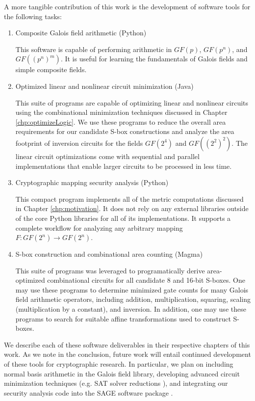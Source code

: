 A more tangible contribution of this work is the development of software tools for the following tasks:
\begin{enumerate}
	\item Composite Galois field arithmetic (Python)
	\vspace{1em}

	This software is capable of performing arithmetic in $GF(p)$, $GF(p^n)$, and $GF((p^n)^m)$. It is useful for learning the fundamentals of Galois fields and simple composite fields. 

	\item Optimized linear and nonlinear circuit minimization (Java)
	\vspace{1em}

	This suite of programs are capable of optimizing linear and nonlinear circuits using the combinational minimization techniques discussed in Chapter \ref{chp:optimizeLogic}. We use these programs to reduce the overall area requirements for our candidate S-box constructions and analyze the area footprint of inversion circuits for the fields $GF(2^4)$ and $GF((2^2)^2)$. The linear circuit optimizations come with sequential and parallel implementations that enable larger circuits to be processed in less time.

	\item Cryptographic mapping security analysis (Python)
	\vspace{1em}

	This compact program implements all of the metric computations discussed in Chapter \ref{chp:motivation}. It does not rely on any external libraries outside of the core Python libraries for all of its implementations. It supports a complete workflow for analyzing any arbitrary mapping $F : GF(2^n) \to GF(2^n)$. 

	\item S-box construction and combinational area counting (Magma)
	\vspace{1em}

	This suite of programs was leveraged to programatically derive area-optimized combinational circuits for all candidate 8 and 16-bit S-boxes. One may use these programs to determine minimized gate counts for many Galois field arithmetic operators, including addition, multiplication, squaring, scaling (multiplication by a constant), and inversion. In addition, one may use these programs to search for suitable affine transformations used to construct S-boxes. 

\end{enumerate}
We describe each of these software deliverables in their respective chapters of this work. As we note in the conclusion, future work will entail continued development of these tools for cryptographic research. In particular, we plan on including normal basis arithmetic in the Galois field library, developing advanced circuit minimization techniques (e.g. SAT solver reductions \cite{Fuhs10-1}), and integrating our security analysis code into the SAGE software package \cite{SAGE}.

